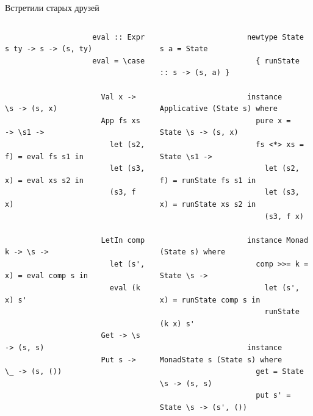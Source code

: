    \begin{frame}[fragile]{Встретили старых друзей}
        \vspace{-2em}
        \begin{columns}[onlytextwidth]
            \begin{column}[t]{0.485\textwidth}
                \begin{verbatim}
                    eval :: Expr s ty -> s -> (s, ty)
                    eval = \case


                      Val x -> \s -> (s, x)
                      App fs xs -> \s1 ->
                        let (s2, f) = eval fs s1 in
                        let (s3, x) = eval xs s2 in
                        (s3, f x)


                      LetIn comp k -> \s ->
                        let (s', x) = eval comp s in
                        eval (k x) s'


                      Get -> \s -> (s, s)
                      Put s -> \_ -> (s, ())
                \end{verbatim}
            \end{column}\hfill%
            \begin{column}[t]{0.485\textwidth}
                \begin{verbatim}
                    newtype State s a = State
                      { runState :: s -> (s, a) }

                    instance Applicative (State s) where
                      pure x = State \s -> (s, x)
                      fs <*> xs = State \s1 ->
                        let (s2, f) = runState fs s1 in
                        let (s3, x) = runState xs s2 in
                        (s3, f x)

                    instance Monad (State s) where
                      comp >>= k = State \s ->
                        let (s', x) = runState comp s in
                        runState (k x) s'

                    instance MonadState s (State s) where
                      get = State \s -> (s, s)
                      put s' = State \s -> (s', ())
                \end{verbatim}
            \end{column}
        \end{columns}
    \end{frame}

